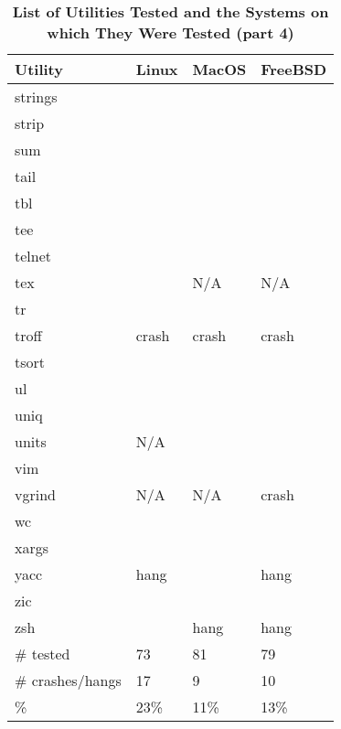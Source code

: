 \begin{table}[htbp]  %
\renewcommand\thetable{1}
\centering  %
 \begin{tabular}{|p{2.5cm}|p{2cm}|p{2cm}|p{2cm}|} 
     \hline
     \hline
        Utility & Linux & MacOS & FreeBSD \\  %
       \hline
       strings &   &   &    \\
       strip &   &   &    \\
       sum &   &   &    \\
       tail &   &   &    \\
       tbl &   &   &    \\
       tee &   &   &    \\
       telnet &   &   &    \\
       tex &   & N/A  & N/A   \\
       tr &   &   &    \\
       troff & crash  & crash  & crash   \\
       tsort &   &   &    \\
       ul &   &   &    \\
       uniq &   &   &    \\
       units & N/A  &   &    \\
       vim &   &   &    \\
       vgrind & N/A  & N/A  & crash   \\
       wc &   &   &    \\
       xargs &   &   &    \\
       yacc & hang  &   & hang   \\
       zic &   &   &    \\
       zsh &   & hang  & hang   \\
       \hline
       \# tested & 73  & 81  &  79  \\
       \# crashes/hangs & 17  & 9  &  10  \\
       \% & 23\%  & 11\%  & 13\%   \\ 
       \hline
       \hline
   \end{tabular}
   \caption{\textbf{List of Utilities Tested and the Systems on which They Were Tested (part 4)}}  %
\end{table}


